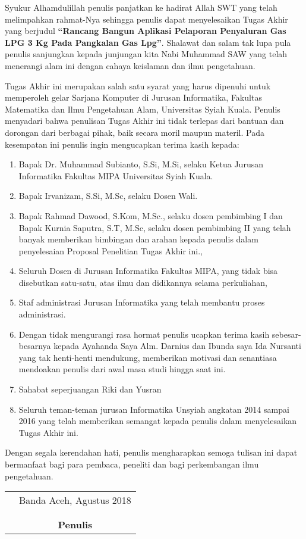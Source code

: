 \preface %


\par Syukur Alhamdulillah penulis panjatkan ke hadirat Allah SWT yang telah melimpahkan rahmat-Nya sehingga penulis dapat menyelesaikan Tugas Akhir yang berjudul \textbf{“Rancang Bangun Aplikasi Pelaporan Penyaluran Gas LPG 3 Kg Pada Pangkalan Gas Lpg”}. Shalawat dan salam tak lupa pula penulis sanjungkan kepada junjungan kita Nabi Muhammad SAW yang telah menerangi alam ini dengan cahaya keislaman dan ilmu pengetahuan.
\par Tugas Akhir ini merupakan salah satu syarat yang harus dipenuhi untuk memperoleh gelar Sarjana Komputer di Jurusan Informatika, Fakultas Matematika dan Ilmu Pengetahuan Alam, Universitas Syiah Kuala. Penulis menyadari bahwa penulisan Tugas Akhir ini tidak terlepas dari bantuan dan dorongan dari berbagai pihak, baik secara moril maupun materil. Pada kesempatan ini penulis ingin mengucapkan terima kasih kepada:

\begin{enumerate}
	\item{Bapak Dr. Muhammad Subianto, S.Si, M.Si, selaku Ketua Jurusan Informatika Fakultas MIPA Universitas Syiah Kuala.}
	\item{Bapak Irvanizam, S.Si, M.Sc, selaku Dosen Wali.}
	\item{Bapak Rahmad Dawood, S.Kom, M.Sc., selaku dosen pembimbing I dan Bapak Kurnia Saputra, S.T, M.Sc, selaku dosen pembimbing II yang telah banyak memberikan bimbingan dan arahan kepada penulis dalam penyelesaian Proposal Penelitian Tugas Akhir ini.,}
	\item{Seluruh Dosen di Jurusan Informatika Fakultas MIPA, yang tidak bisa disebutkan satu-satu, atas ilmu dan didikannya selama perkuliahan,}
	\item {Staf administrasi Jurusan Informatika yang telah membantu proses administrasi.}
	\item{Dengan tidak mengurangi rasa hormat penulis ucapkan terima kasih sebesar- besarnya kepada Ayahanda Saya Alm. Darnius dan Ibunda saya Ida Nursanti yang tak henti-henti mendukung, memberikan motivasi dan senantiasa mendoakan penulis dari awal masa studi hingga saat ini.}
	\item {Sahabat seperjuangan Riki dan Yusran } 
	\item{Seluruh teman-teman jurusan Informatika Unsyiah angkatan 2014 sampai 2016 yang telah memberikan semangat kepada penulis dalam menyelesaikan Tugas Akhir ini.}
\end{enumerate}


Dengan segala kerendahan hati, penulis mengharapkan semoga tulisan ini
dapat bermanfaat bagi para pembaca, peneliti dan bagi perkembangan ilmu
pengetahuan.

\vspace{0.5cm}


\begin{tabular}{p{7.5cm}c}
	&Banda Aceh, Agustus 2018\\
	&\\
	&\\
	&\textbf{Penulis}
\end{tabular}